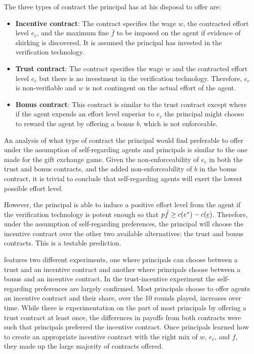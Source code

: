 \documentclass[12pt]{article}
\newcommand{\ubar}[1]{\underaccent{\bar}{#1}}
\begin{document}
The three types of contract the principal has at his disposal to offer are:

\begin{itemize}
	\item \textbf{Incentive contract}: The contract specifies the wage $w$, the contracted effort level $e_c$, and the maximum fine $\bar{f}$ to be imposed on the agent if evidence of shirking is discovered. It is assumed the principal has invested in the verification technology.
	\item \textbf{Trust contract}: The contract specifies the wage $w$ and the contracted effort level $e_c$ but there is no investment in the verification technology. Therefore, $e_c$ is non-verifiable and $w$ is not contingent on the actual effort of the agent.
	\item \textbf{Bonus contract}: This contract is similar to the trust contract except where if the agent expends an effort level superior to $e_c$ the principal might choose to reward the agent by offering a bonus $b$, which is not enforceable.
\end{itemize}

An analysis of what type of contract the principal would find preferable to offer under the assumption of self-regarding agents and principals is similar to the one made for the gift exchange game. Given the non-enforceability of $e_c$ in both the trust and bonus contracts, and the added non-enforceability of $b$ in the bonus contract, it is trivial to conclude that self-regarding agents will exert the lowest possible effort level. 

However, the principal is able to induce a positive effort level from the agent if the verification technology is potent enough so that $p\bar{f} \geq c(e^*) - c(\ubar{e})$. Therefore, under the assumption of self-regarding preferences, the principal will choose the incentive contract over the other two available alternatives: the trust and bonus contracts. This is a testable prediction.

\cite{fehr2007fairness} features two different experiments, one where principals can choose between a trust and an incentive contract and another where principals choose between a bonus and an incentive contract. In the trust-incentive experiment the self-regarding preferences are largely confirmed. Most principals choose to offer agents an incentive contract and their share, over the 10 rounds played, increases over time. While there is experimentation on the part of most principals by offering a trust contract at least once, the differences in payoffs from both contracts were such that principals preferred the incentive contract. Once principals learned how to create an appropriate incentive contract with the right mix of $w$, $e_c$, and $f$, they made up the large majority of contracts offered.
\end{document}
